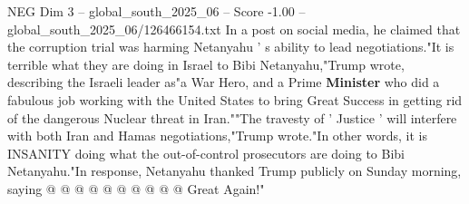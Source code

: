 \begin{textsample}{NEG Dim 3 – global\_south\_2025\_06 – Score -1.00 – global\_south\_2025\_06/126466154.txt}
In a post on social media, he claimed that the corruption trial was harming Netanyahu ' s ability to lead negotiations."It is terrible what they are doing in Israel to Bibi Netanyahu,"Trump wrote, describing the Israeli leader as"a War Hero, and a Prime \textbf{Minister} who did a fabulous job working with the United States to bring Great Success in getting rid of the dangerous Nuclear threat in Iran.""The travesty of ' Justice ' will interfere with both Iran and Hamas negotiations,"Trump wrote."In other words, it is INSANITY doing what the out-of-control prosecutors are doing to Bibi Netanyahu."In response, Netanyahu thanked Trump publicly on Sunday morning, saying @ @ @ @ @ @ @ @ @ @ Great Again!"

\end{textsample}
